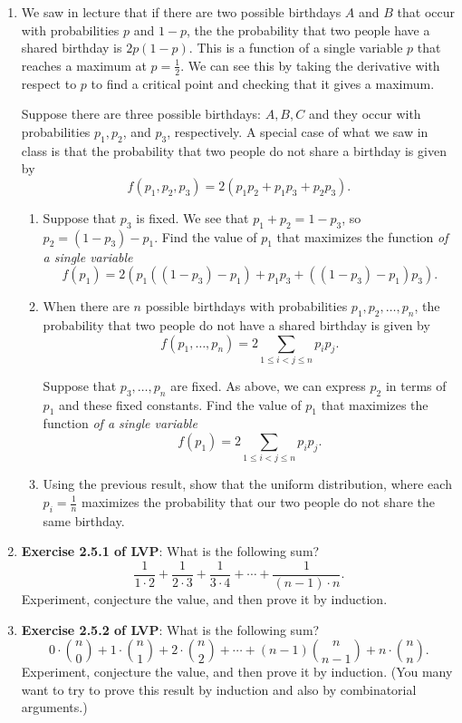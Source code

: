 \documentclass[11pt]{article}
\begin{document}
\begin{enumerate}

\item We saw in lecture that if there are two possible birthdays $A$ and $B$  that occur with probabilities $p$ and $1-p$, the the probability that two people have a shared birthday is $2 p(1-p)$.  This is a function of a single variable $p$ that reaches a maximum at $p = \frac{1}{2}$.  We can see this by taking the derivative with respect to $p$ to find a critical point and checking that it gives a maximum.

Suppose there are three possible birthdays: $A,B,C$ and they occur with probabilities $p_1, p_2$, and $p_3$, respectively.  A special case of what we saw in class is that the probability that two people do not share a birthday is given by
\[
f(p_1, p_2, p_3) = 2\left(p_1 p_2 + p_1 p_3 + p_2 p_3\right).
\]
\begin{enumerate}
\item Suppose that $p_3$ is fixed.  We see that $p_1 + p_2 = 1-p_3$, so $p_2 = (1-p_3) - p_1$.  Find the value of $p_1$ that maximizes the function \emph{of a single variable}
\[
f(p_1) = 2 \left(p_1 ((1-p_3) - p_1) + p_1 p_3 + ((1-p_3) - p_1) p_3\right).
\]

\item When there are $n$ possible birthdays with probabilities $p_1,p_2,\ldots, p_n$, the probability that two people do not have a shared birthday is given by
\[
f(p_1,\ldots, p_n) = 2 \sum_{1\le i < j \le n} p_i p_j.
\]

Suppose that $p_3,\ldots, p_n$ are fixed.  As above, we can express $p_2$ in terms of $p_1$ and these fixed constants.  Find the value of $p_1$ that maximizes the function \emph{of a single variable}
\[
f(p_1) = 2 \sum_{1\le i < j \le n} p_i p_j.
\]

\item Using the previous result, show that the uniform distribution, where each $p_i = \frac{1}{n}$ maximizes the probability that our two people do not share the same birthday.

\end{enumerate}

\item {\bf Exercise 2.5.1 of LVP}: What is the following sum?
\[
\frac{1}{1\cdot 2}+\frac{1}{2\cdot 3} +\frac{1}{3\cdot 4} + \cdots + \frac{1}{(n-1)\cdot n}.
\]
Experiment, conjecture the value, and then prove it by induction.

\item {\bf Exercise 2.5.2 of LVP}: What is the following sum?
\[
0\cdot \binom{n}{0} + 1 \cdot \binom{n}{1} + 2\cdot \binom{n}{2} + \cdots + (n-1) \binom{n}{n-1} + n \cdot \binom{n}{n}.
\]
Experiment, conjecture the value, and then prove it by induction.  (You many want to try to prove this result by induction and also by combinatorial arguments.)


\end{enumerate}
\end{document}
